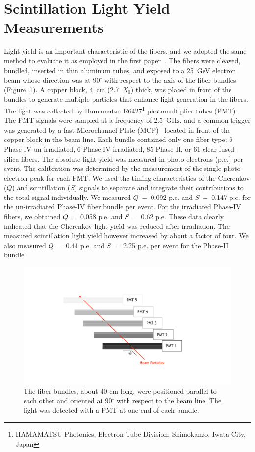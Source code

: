 \documentclass[a4paper,11pt]{article}
\begin{document}
\section{Scintillation Light Yield Measurements}
\label{sec:lightyield}
Light yield is an important characteristic of the fibers, and we adopted the same method to evaluate it as employed in the first paper~\cite{JINSTPaper}.   The fibers were cleaved, bundled, inserted in thin aluminum tubes, and exposed to a 25~GeV electron beam whose direction was at $90^{\circ}$ with respect to the axis of the fiber bundles (Figure~\ref{fig:bundles}). A copper block, 4~cm (2.7~$X_0$) thick, was placed in front of the bundles to generate multiple particles that enhance light generation in the fibers. The light was collected by Hamamatsu R6427\footnote{HAMAMATSU Photonics, Electron Tube Division, Shimokanzo, Iwata City, Japan} photomultiplier tubes (PMT). The PMT signals were sampled at a frequency of 2.5~GHz, and a common trigger was generated by a fast Microchannel Plate (MCP)~\cite{r-MCP} located in front of the copper block in the beam line. Each bundle contained only one fiber type: 6 Phase-IV un-irradiated, 6 Phase-IV irradiated, 85 Phase-II, or 61 clear fused-silica fibers. The absolute light yield was measured in photo-electrons (p.e.) per event. The calibration was determined by the measurement of the single photo-electron peak for each PMT. We used the timing characteristics of the Cherenkov ($Q$) and scintillation ($S$) signals to separate and integrate their contributions to the total signal individually. We measured $Q$~=~0.092 p.e. and $S$~=~0.147 p.e. for the un-irradiated Phase-IV fiber bundle per event. For the irradiated Phase-IV fibers, we obtained $Q$~=~0.058 p.e. and $S$~=~0.62 p.e.  These data clearly indicated that the Cherenkov light yield was reduced after irradiation. The measured scintillation light yield however increased by about a factor of four. We also measured $Q$~=~0.44 p.e. and $S$~=~2.25 p.e. per event for the Phase-II bundle.
\begin{figure}[ht]
\begin{center}\vspace{-1pc}
      \includegraphics[width=12cm]{Figures/FiberBundles.pdf}
\caption{\small The fiber bundles, about 40 cm long, were positioned parallel to each other and oriented at 90$^\circ$ with respect to the beam line. The light was detected with a PMT at one end of each bundle.}
    \label{fig:bundles}
\end{center}
\end{figure}
\end{document}
